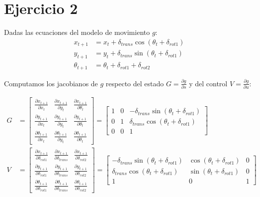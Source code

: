 \documentclass[12pt]{article}
\begin{document}
\section*{Ejercicio 2}

Dadas las ecuaciones del modelo de movimiento $g$:
\begin{align*}
	x_{t+1} &= x_t + \delta_{trans} \cos(\theta_t + \delta_{rot1}) \\
	y_{t+1} &= y_t + \delta_{trans} \sin(\theta_t + \delta_{rot1}) \\
	\theta_{t+1} &= \theta_t + \delta_{rot1} + \delta_{rot2}
\end{align*}

Computamos los jacobianos de $g$ respecto del estado $G = \frac{\partial g}{\partial s}$ y del control $V = \frac{\partial g}{\partial u}$:

\begin{align*}
	G &= \begin{bmatrix}
		\frac{\partial x_{t+1}}{\partial x_t} & \frac{\partial x_{t+1}}{\partial y_t} & \frac{\partial x_{t+1}}{\partial \theta_t} \\
		\frac{\partial y_{t+1}}{\partial x_t} & \frac{\partial y_{t+1}}{\partial y_t} & \frac{\partial y_{t+1}}{\partial \theta_t} \\
		\frac{\partial \theta_{t+1}}{\partial x_t} & \frac{\partial \theta_{t+1}}{\partial y_t} & \frac{\partial \theta_{t+1}}{\partial \theta_t}
	\end{bmatrix} = \begin{bmatrix}
		1 & 0 & -\delta_{trans}\sin(\theta_t + \delta_{rot1}) \\
		0 & 1 & \delta_{trans}\cos(\theta_t + \delta_{rot1}) \\
		0 & 0 & 1
	\end{bmatrix} \\
	V &= \begin{bmatrix}
		\frac{\partial x_{t+1}}{\partial \delta_{rot1}} & \frac{\partial x_{t+1}}{\partial \delta_{trans}} & \frac{\partial x_{t+1}}{\partial \delta_{rot2}} \\
		\frac{\partial y_{t+1}}{\partial \delta_{rot1}} & \frac{\partial y_{t+1}}{\partial \delta_{trans}} & \frac{\partial y_{t+1}}{\partial \delta_{rot2}} \\
		\frac{\partial \theta_{t+1}}{\partial \delta_{rot1}} & \frac{\partial \theta_{t+1}}{\partial \delta_{trans}} & \frac{\partial \theta_{t+1}}{\partial \delta_{rot2}}
	\end{bmatrix} = \begin{bmatrix}
		-\delta_{trans}\sin(\theta_t + \delta_{rot1}) & \cos(\theta_t + \delta_{rot1}) & 0 \\
		\delta_{trans}\cos(\theta_t + \delta_{rot1}) & \sin(\theta_t + \delta_{rot1}) & 0 \\
		1 & 0 & 1
	\end{bmatrix}
\end{align*}
\end{document}
